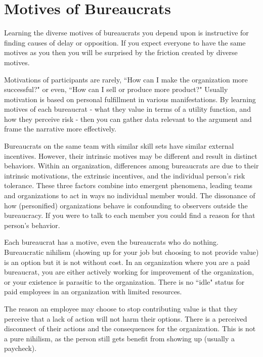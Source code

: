 \section{Motives of Bureaucrats\label{sec:motivations}}

Learning the diverse motives of bureaucrats you depend upon is instructive for finding causes of delay or opposition. If you expect everyone to have the same motives as you then you will be surprised by the friction created by diverse motives. 

Motivations of participants are rarely, ``How can I make the organization more successful?" or even, ``How can I sell or produce more product?" Usually motivation is based on personal fulfillment in various manifestations. By learning motives of each bureaucrat - what they value in terms of a utility function, and how they perceive risk - then you can gather data relevant to the argument and frame the narrative more effectively.


Bureaucrats on the same team with similar skill sets have similar external incentives. However, their intrinsic motives may be different and result in distinct behaviors. Within an organization, differences among bureaucrats are due to their intrinsic motivations, the extrinsic incentives, and the individual person's risk tolerance. These three factors combine into emergent phenomena, leading teams and organizations to act in ways no individual member would. The dissonance of how (personified) organizations behave is confounding to observers outside the bureaucracy. If you were to talk to each member you could find a reason for that person's behavior. 



Each bureaucrat has a motive, even the bureaucrats who do nothing. Bureaucratic nihilism (showing up for your job but choosing to not provide value) is an option but it is not without cost.
In an organization where you are a paid bureaucrat, you are either actively working for improvement of the organization, or your existence is parasitic to the organization. There is no ``idle" status for paid employees in an organization with limited resources.

The reason an employee may choose to stop contributing value is that they perceive that a lack of action will not harm their options. There is a perceived disconnect of their actions and the consequences for the organization. This is not a pure nihilism, as the person still gets benefit from showing up (usually a paycheck).

